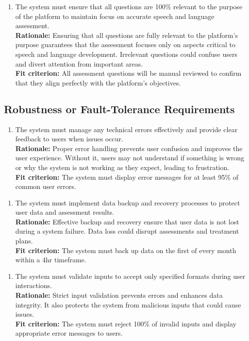 \documentclass[12pt]{article}
\begin{document}
\begin{enumerate}[{PR-PA}5. ]
  \item The system must ensure that all questions are 100\% relevant to the purpose of the platform to maintain focus on accurate speech and language assessment.\\
  \textbf{Rationale: }Ensuring that all questions are fully relevant to the platform’s purpose guarantees that the assessment focuses only on aspects critical to speech and language development. Irrelevant questions could confuse users and divert attention from important areas.\\
  \textbf{Fit criterion: }All assessment questions will be manual reviewed to confirm that they align perfectly with the platform's objectives.  
\end{enumerate}

\subsection{Robustness or Fault-Tolerance Requirements}
\begin{enumerate}[{PR-RFT}1. ]
  \item The system must manage any technical errors effectively and provide clear feedback to users when issues occur.\\
  \textbf{Rationale: }Proper error handling prevents user confusion and improves the user experience. Without it, users may not understand if something is wrong or why the system is not working as they expect, leading to frustration.\\
  \textbf{Fit criterion: }The system must display error messages for at least 95\% of common user errors.  
\end{enumerate}
\begin{enumerate}[{PR-RFT}2. ]
  \item The system must implement data backup and recovery processes to protect user data and assessment results.\\
  \textbf{Rationale: }Effective backup and recovery ensure that user data is not lost during a system failure. Data loss could disrupt assessments and treatment plans.\\
  \textbf{Fit criterion: }The system must back up data on the first of every month within a 4hr timeframe.  
\end{enumerate}
\begin{enumerate}[{PR-RFT}3. ]
  \item The system must validate inputs to accept only specified formats during user interactions.\\
  \textbf{Rationale: }Strict input validation prevents errors and enhances data integrity. It also protects the system from malicious inputs that could cause issues.\\
  \textbf{Fit criterion: }The system must reject 100\% of invalid inputs and display appropriate error messages to users.  
\end{enumerate}
\end{document}
